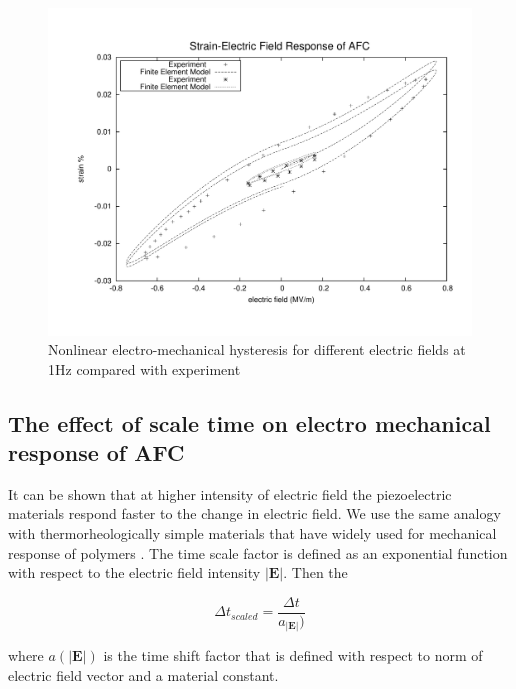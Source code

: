 \begin{figure} 
\centering
\includegraphics[trim = 0mm 0mm 0mm 0mm,width=5.0in]
{./chap_4_structural_analyses/afc_unit_cell/non_linear_hysteris_afc/non_linear_electric_field_vs_polarization.pdf}
\caption{Nonlinear electro-mechanical hysteresis for different electric fields at 1Hz compared with experiment}
\label{fig:non_linear_electric_field_vs_polarization}
\end{figure}

\subsection{The effect of scale time on electro mechanical response of AFC}
It can be shown that at higher intensity of electric field the piezoelectric materials respond faster to the change in electric field.
We use the same analogy with thermorheologically simple materials that have widely used for mechanical response of polymers \cite{haj2004numerical, tscharnuter2012nonlinear}.
The time scale factor is defined as an exponential function with respect to the electric field intensity $|\textbf {E}|$.
Then the 



\begin{equation}
	\Delta t _{scaled} = \frac{ \Delta t } { a_{ |\textbf {E}| } ) }
\label{equation:time_scaling}	
\end{equation}

where ${a(|\textbf {E}|)}$ is the time shift factor that is defined with respect to norm of electric field vector and a material constant.
 
